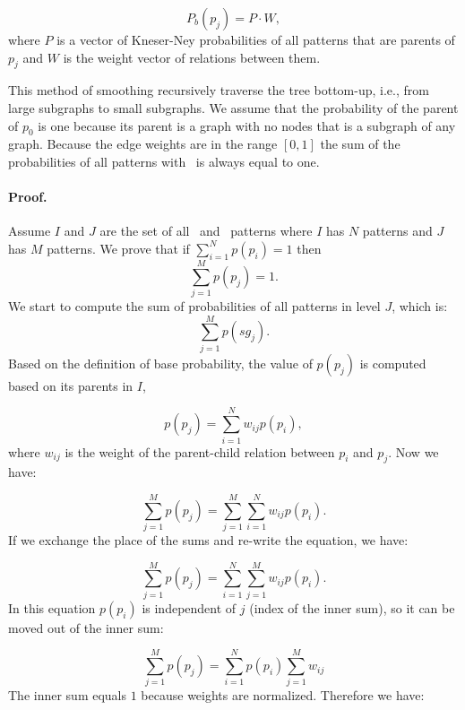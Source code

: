 \begin{equation*}
P_b(p_j)  = P \cdot W,
\end{equation*}
%
where $P$ is a vector of \mbox{Kneser-Ney} probabilities of all patterns that are parents of $p_j$ and $W$ is the weight vector of relations between them. 

This method of smoothing recursively traverse the tree bottom-up, i.e., from large subgraphs to small subgraphs. 
We assume that the probability of the parent of $p_0$ is one because its parent is a graph with no nodes that is a subgraph of any graph.
Because the edge weights are in the range $[0,1]$ the
sum of the probabilities of all patterns with \knode\ is always
equal to one. 

\paragraph{Proof.} 
Assume $I$ and $J$ are the set of all \knode\ and \kplusnode\
patterns where $I$ has $N$ patterns and $J$ has $M$ patterns. 
We prove that if $\sum_{i=1}^N p(p_i)=1$ then 
\begin{equation*}
\sum_{j=1}^M p(p_j)=1. 
\end{equation*}
%
We start to compute the sum of probabilities of all patterns in level $J$, which is: 
\begin{equation*}
\sum_{j=1}^M p(sg_j).
\end{equation*}
%
Based on the definition of base probability, the value of
$p(p_j)$ is computed based on its parents in $I$,

\begin{equation*}
p(p_j)=\sum_{i=1}^N w_{ij}p(p_i),
\end{equation*}
%
where $w_{ij}$ is the weight of the \mbox{parent-child} relation between
$p_i$ and $p_j$. 
Now we have:

\begin{equation*}\sum_{j=1}^M p(p_j) = \sum_{j=1}^M\sum_{i=1}^N w_{ij}p(p_i).
\end{equation*}
%
If we exchange the place of the sums and \mbox{re-write} the equation, we have: 

\begin{equation*}
\sum_{j=1}^M p(p_j) = \sum_{i=1}^N \sum_{j=1}^M w_{ij}p(p_i).
\end{equation*}
%
In this equation $p(p_i)$ is independent of $j$ (index of the inner sum), so it can be moved out of the inner sum:

\begin{equation*}
\sum_{j=1}^M p(p_j) = \sum_{i=1}^N p(p_i) \sum_{j=1}^M w_{ij}
\end{equation*}
%
The inner sum equals $1$ because weights are normalized. 
Therefore we have:

